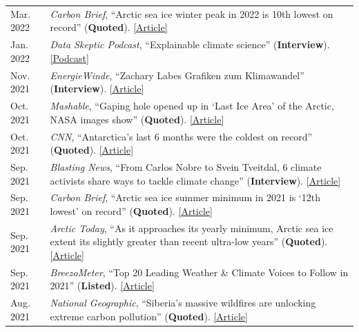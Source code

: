 \documentclass[margin,line,palatino,courier,10pt]{res}
\begin{document}
\begin{resume}
\begin{tabular}{@{}p{0.9in}p{4in}}
Mar. 2022 & \textit{Carbon Brief}, ``Arctic sea ice winter peak in 2022 is 10th lowest on record'' (\textbf{Quoted}). \href{https://www.carbonbrief.org/arctic-sea-ice-winter-peak-in-2022-is-10th-lowest-on-record}{[Article]}\\
Jan. 2022 & \textit{Data Skeptic Podcast}, ``Explainable climate science'' (\textbf{Interview}). \href{https://dataskeptic.com/blog/episodes/2022/explainable-climate-science}{[Podcast]}\\
Nov. 2021 & \textit{EnergieWinde}, ``Zachary Labes Grafiken zum Klimawandel'' (\textbf{Interview}). \href{https://energiewinde.orsted.de/klimawandel-umwelt/zachary-labe-grafiken-arktis-klimawandel-interview-wissenschaftskommunikation}{[Article]}\\
Oct. 2021 & \textit{Mashable}, ``Gaping hole opened up in `Last Ice Area' of the Arctic, NASA images show'' (\textbf{Quoted}). \href{https://mashable.com/article/arctic-climate-change}{[Article]}\\
Oct. 2021 & \textit{CNN}, ``Antarctica's last 6 months were the coldest on record'' (\textbf{Quoted}). \href{https://www.cnn.com/2021/10/09/weather/weather-record-cold-antarctica-climate-change/index.html}{[Article]}\\
Sep. 2021 & \textit{Blasting News}, ``From Carlos Nobre to Svein Tveitdal, 6 climate activists share ways to tackle climate change'' (\textbf{Interview}). \href{https://us.blastingnews.com/world/2021/01/from-carlos-nobre-to-svein-tveitdal-4-climate-activists-share-ways-to-tackle-climate-change-003258138.html}{[Article]}\\
Sep. 2021 & \textit{Carbon Brief}, ``Arctic sea ice summer minimum in 2021 is `12th lowest' on record'' (\textbf{Quoted}). \href{https://www.carbonbrief.org/arctic-sea-ice-summer-minimum-in-2021-is-12th-lowest-on-record}{[Article]}\\
Sep. 2021 & \textit{Arctic Today}, ``As it approaches its yearly minimum, Arctic sea ice extent its slightly greater than recent ultra-low years'' (\textbf{Quoted}). \href{https://www.arctictoday.com/as-it-approaches-its-yearly-minimum-arctic-sea-ice-extent-its-slightly-greater-than-recent-ultra-low-years/}{[Article]}\\
Sep. 2021 & \textit{BreezoMeter}, ``Top 20 Leading Weather \& Climate Voices to Follow in 2021'' (\textbf{Listed}). \href{https://blog.breezometer.com/leading-weather-climate-voices-to-follow}{[Article]}\\
Aug. 2021 & \textit{National Geographic}, ``Siberia’s massive wildfires are unlocking extreme carbon pollution'' (\textbf{Quoted}). \href{https://www.nationalgeographic.com/environment/article/siberias-massive-wildfires-are-unlocking-extreme-carbon-pollution}{[Article]}\\

\end{tabular}
\end{resume}
\end{document}
